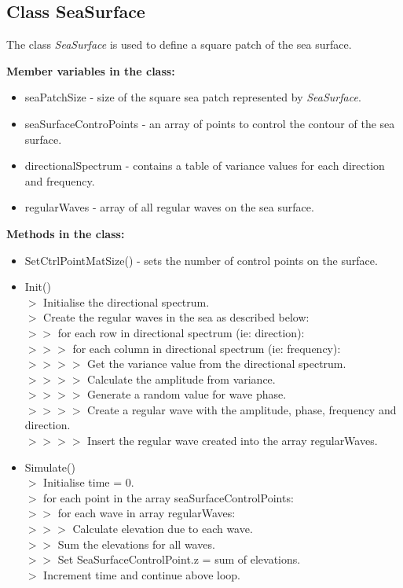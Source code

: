 \subsection{Class SeaSurface} \label{Class SeaSurface}

The class \textit{SeaSurface} is used to define a square patch of the sea 
surface.

\textbf{Member variables in the class:}
\begin{itemize}
  \item seaPatchSize - size of the square sea patch represented by 
    \textit{SeaSurface}.
  \item seaSurfaceControPoints - an array of points to control the contour of 
    the sea surface.
  \item directionalSpectrum - contains a table of variance values for each
    direction and frequency.
  \item regularWaves - array of all regular waves on the sea surface.
\end{itemize}

\textbf{Methods in the class:}
\begin{itemize}
  \item SetCtrlPointMatSize() - sets the number of control points on the
    surface.
  \item Init()\\
    $>$ Initialise the directional spectrum.\\
    $>$ Create the regular waves in the sea as described below:\\
    $>>$ for each row in directional spectrum (ie: direction):\\
    $>>>$ for each column in directional spectrum (ie: frequency):\\
  	$>>>>$ Get the variance value from the directional spectrum.\\
  	$>>>>$ Calculate the amplitude from variance.\\
    $>>>>$ Generate a random value for wave phase.\\
    $>>>>$ Create a regular wave with the amplitude, phase, frequency and 
          direction.\\
    $>>>>$ Insert the regular wave created into the array regularWaves.
  \item Simulate() \\
    $>$ Initialise time = 0.\\ 
  	$>$ for each point in the array seaSurfaceControlPoints:\\
  	$>>$ for each wave in array regularWaves:\\
  	$>>>$ Calculate elevation due to each wave.\\
    $>>$ Sum the elevations for all waves.\\
    $>>$ Set SeaSurfaceControlPoint.z = sum of elevations.\\
  	$>$ Increment time and continue above loop.
\end{itemize}

